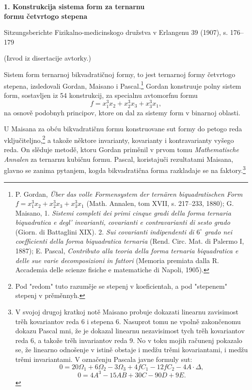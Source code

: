 \documentclass[11pt]{article}
\begin{document}
\begin{center}
{\Large\bfseries 1. Konstrukcija sistema form za ternarnu\\ formu četvrtogo stepena}\par
\vspace{1.5em}
Sitzungsberichte Fizikalno-medicinskogo družstva v Erlangenu 39 (1907), s. 176--179
\end{center}

\vspace{4em}
\begin{center}
(Izvod iz disertacije avtorky.)
\end{center}

Sistem form ternarnoj bikvadratičnoj formy, to jest ternarnoj formy četvrtogo stepena, izsledovali Gordan, Maisano i Pascal.\footnote{P. Gordan, \emph{Über das volle Formensystem der ternären biquadratischen Form} $f=x_1^3x_2+x_2^3x_3+x_3^3x_1$ (Math. Annalen, tom XVII, s. 217--233, 1880); G. Maisano, 1. \emph{Sistemi completi dei primi cinque gradi della forma ternaria biquadratica e degl' invarianti, covarianti e contravarianti di sesto grado} (Giorn. di Battaglini XIX). 2. \emph{Sui covarianti indipendenti di $6^\circ$ grado nei coefficienti della forma biquadratica ternaria} (Rend. Circ. Mat. di Palermo I, 1887); E. Pascal, \emph{Contributo alla teoria della forma ternaria biquadratica e delle sue varie decomposizioni in fattori} (Memoria premiata dalla R. Accademia delle scienze fisiche e matematiche di Napoli, 1905).}
Gordan konstruuje polny sistem form, sostavljen iz 54 konstrukcij, za specialnu avtomorfnu formu
\[
f=x_1^3x_2+x_2^3x_3+x_3^3x_1,
\]
na osnově podobnyh principov, ktore on dal za sistemy form v binarnoj oblasti.

U Maisana za obću bikvadratičnu formu konstruovane sut formy do petogo reda vključiteljno,\footnote{Pod "redom" tuto razuměje se stepenj v koeficientah, a pod "stepenem" stepenj v prěměnnyh.}
a takože něktore invarianty, kovarianty i kontravarianty vyšego reda. On slěduje metodě, ktoru Gordan priměnil v prvom tomu \emph{Mathematische Annalen} za ternarnu kubičnu formu. Pascal, koristajuči rezultatami Maisana, glavno se zanima pytanjem, kogda bikvadratična forma razkladaje se na faktory.\footnote{V svojoj drugoj kratkoj notě Maisano probuje dokazati linearnu zavisimost trěh kovariantov reda 6 i stepena 6. Nasuprot tomu ne vpolně zakončenomu dokazu Pascal mni, že je dokazal linearnu nezavisimost tych trěh kovariantov reda 6, a takože trěh invariantov reda 9. No v toku mojih računenj pokazalo se, že linearno odnošenje v istině obstaje i medžu trěmi kovariantami, i medžu trěmi invariantami. V označenju Pascala javne formuly sut:
\[
0=20\Omega_1+6\Omega_2-3\Omega_3+4fC_1-12fC_2-4A\cdot\Delta,
\]
\[
0=4A^3-15AB+30C-90D+9E.
\]}
\end{document}

